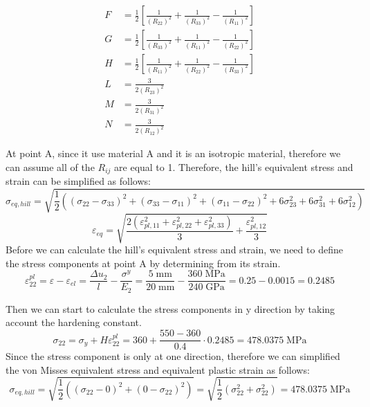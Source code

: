 \documentclass[12pt]{article}
\begin{document}
\begin{align*}
F &= \frac{1}{2} \left[ \frac{1}{(R_{22})^2} + \frac{1}{(R_{33})^2} - \frac{1}{(R_{11})^2} \right] \\
G &= \frac{1}{2} \left[ \frac{1}{(R_{33})^2} + \frac{1}{(R_{11})^2} - \frac{1}{(R_{22})^2} \right] \\
H &= \frac{1}{2} \left[ \frac{1}{(R_{11})^2} + \frac{1}{(R_{22})^2} - \frac{1}{(R_{33})^2} \right] \\
L &= \frac{3}{2(R_{23})^2} \\
M &= \frac{3}{2(R_{31})^2} \\
N &= \frac{3}{2(R_{12})^2}
\end{align*}

At point A, since it use material A and it is an isotropic material, 
therefore we can assume all of the $R_{ij}$ are equal to 1. Therefore, the hill's
equivalent stress and strain can be simplified as follows:
\begin{equation}
    \sigma_{eq, hill} = \sqrt{\frac{1}{2}((\sigma_{22}-\sigma_{33})^2 + (\sigma_{33}-\sigma_{11})^2 + (\sigma_{11}-\sigma_{22})^2 + 6\sigma_{23}^2 + 6\sigma_{31}^2 + 6\sigma_{12}^2)}
\end{equation}
\begin{equation}
    \varepsilon_{eq} = \sqrt{\frac{2(\varepsilon_{pl,11}^2 + \varepsilon_{pl,22}^2 + \varepsilon_{pl,33}^2)}{3} + \frac{\varepsilon_{pl,12}^2}{3}}
\end{equation}
Before we can calculate the hill's equivalent stress and strain,
we need to define the stress components at point A by determining from its strain.
\begin{equation}
    \varepsilon_{22}^{pl} = \varepsilon - \varepsilon_{el} = \frac{\Delta u_{2}}{l} - \frac{\sigma^y}{E_{2}} = \frac{5 \;\text{mm}}{20 \;\text{mm}} - \frac{360 \;\text{MPa}}{240 \;\text{GPa}} = 0.25 - 0.0015 = 0.2485
\end{equation}

Then we can start to calculate the stress components in y direction by taking account the hardening
constant.
\begin{equation}
    \sigma_{22} = \sigma_{y} + H\varepsilon_{22}^{pl} =  360  + \frac{550-360}{0.4} \cdot 0.2485 = 478.0375 \;\text{MPa}
\end{equation}
Since the stress component is only at one direction, therefore we can simplified the von Misses equivalent stress
and equivalent plastic strain as follows:
\begin{equation}
    \sigma_{eq, hill} = \sqrt{\frac{1}{2}((\sigma_{22}-0)^2 +  (0-\sigma_{22})^2)} = \sqrt{\frac{1}{2}(\sigma_{22}^2 + \sigma_{22}^2)} = 478.0375 \;\text{MPa}
\end{equation}
\end{document}
